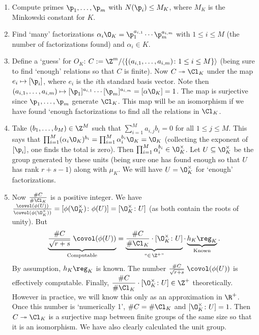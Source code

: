 \begin{enumerate}[1.]
\item Compute primes $\p_1,\ldots,\p_m$ with $N(\p_i) \leq M_K$, where $M_K$ is the Minkowski constant for $K$. 

\item Find `many' factorizations $\alpha_i \O_K= \p_1^{a_{i,1}} \cdots \p_m^{a_{i,m}}$ with $1 \leq i \leq M$ (the number of factorizations found) and $\alpha_i \in K$. 

\item Define a `guess' for $O_K$: $C:= \Z^m/\langle \{(a_{i,1},\ldots,a_{i,m}) \colon 1 \leq i \leq M\} \rangle$ (being sure to find `enough' relations so that $C$ is finite). Now $C \twoheadrightarrow \Cl_K$ under the map $e_i \mapsto [\p_i]$, where $e_i$ is the $i$th standard basis vector. Note then $(a_{i,1},\ldots,a_{i,m}) \mapsto [\p_1]^{a_{i,1}} \cdots [\p_m]^{a_{i,m}}=[\alpha \O_K]=1$. The map is surjective since $\p_1,\ldots,\p_m$ generate $\Cl_K$. This map will be an isomorphism if we have found `enough factorizations to find all the relations in $\Cl_K$.

\item Take $(b_1,\ldots,b_M) \in \Z^M$ such that $\sum_{i=1}^M a_{i,j} b_i=0$ for all $1 \leq j \leq M$. This says that $\prod_{i=1}^M (\alpha_i \O_K)^{b_i}=\prod_{i=1}^M \alpha_i^{b_i} \O_K= \O_K$ (collecting the exponent of $[\p_i]$, one finds the total is zero). Then $\prod_{i=1}^M \alpha_i^{b_i} \in \O_K^\times$. Let $U \subseteq \O_K^\times$ be the group generated by these units (being sure one has found enough so that $U$ has rank $r+s-1$) along with $\mu_K$. We will have $U=\O_K^\times$ for `enough' factorizations.

\item Now $\frac{\#C}{\#\Cl_K}$ is a positive integer. We have $\frac{\covol(\phi(U))}{\covol(\phi(\O_K^\times))}=[\phi(\O_K^\times) \colon \phi(U)]=[\O_K^\times \colon U]$ (as both contain the roots of unity). But
	\[
	\underbrace{\dfrac{\#C}{\sqrt{r+s}} \;\covol(\phi(U))}_{\text{Computable}} = \underbrace{\dfrac{\#C}{\#\Cl_K} \cdot [\O_K^\times \colon U]}_{\text{``}\in\, \Z^+\text{''}} \cdot \underbrace{h_K \reg_K}_{\text{Known}}.
	\]
By assumption, $h_K \reg_K$ is known. The number $\frac{\#C}{\sqrt{r+s}} \;\covol(\phi(U))$ is effectively computable. Finally, $\dfrac{\#C}{\#\Cl_K} \cdot [\O_K^\times \colon U] \in \Z^+$ theoretically. However in practice, we will know this only as an approximation in $\R^+$. Once this number is `numerically 1', $\#C=\#\Cl_K$ and $[\O_K^\times \colon U]=1$. Then $C \twoheadrightarrow \Cl_K$ is a surjective map between finite groups of the same size so that it is an isomorphism. We have also clearly calculated the unit group. 
\end{enumerate}





